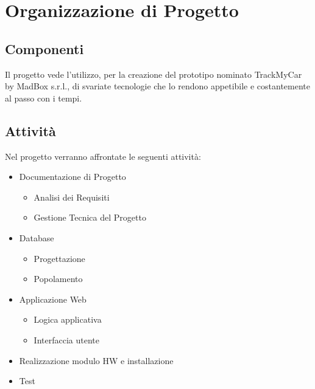\documentclass[a4paper,12pt]{article}
\begin{document}
\pagebreak

\section{Organizzazione di Progetto}
\subsection{Componenti}
Il progetto vede l'utilizzo, per la creazione del prototipo nominato TrackMyCar by MadBox s.r.l., di svariate tecnologie che lo rendono appetibile e costantemente al passo con i tempi.
\subsection{Attività}
Nel progetto verranno affrontate le seguenti attività:
\begin{itemize}
\item Documentazione di Progetto
\begin{itemize}
\item Analisi dei Requisiti
\item Gestione Tecnica del Progetto
\end{itemize}
\item Database
\begin{itemize}
\item Progettazione 
\item Popolamento
\end{itemize}
\item Applicazione Web
\begin{itemize}
\item Logica applicativa
\item Interfaccia utente
\end{itemize}
\item Realizzazione modulo HW e installazione
\item Test
\end{itemize}

\pagebreak
\end{document}
